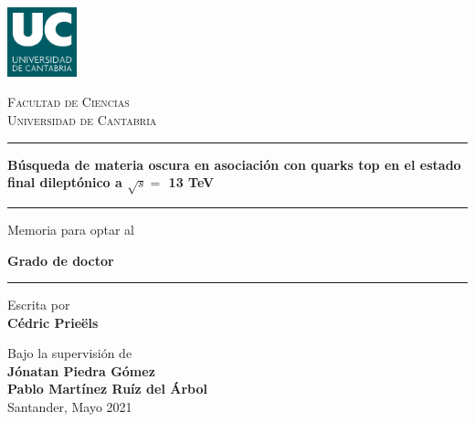 \documentclass[a4paper, 10pt, openright]{report}
\begin{document}

\thispagestyle{empty}
\phantom{a}
\vfill
\newpage

\begin{titlepage}

	\centering
	\includegraphics[width=0.15\textwidth]{figs/image_UC.png}\par
	{\scshape\LARGE Facultad de Ciencias \\ \vspace{-15pt} Universidad de Cantabria \par}
	
	\vspace{0.8cm}
	
	\noindent\rule{15cm}{0.4pt}\par 
	{\huge\bfseries B\'{u}squeda de materia oscura en asociaci\'{o}n con quarks top en el estado final dilept\'{o}nico a $\sqrt{s} = $ 13 TeV\par \vspace{10pt}}
	\noindent\rule{15cm}{0.4pt}\par 
	
	{\vspace{20pt} \Large Memoria para optar al \par \LARGE \textbf{Grado de doctor} \vspace{20pt} \par \noindent\rule{15cm}{0.4pt}}
	
	\vspace{0.8cm}
	{\Large Escrita por \\ \textbf{C\'{e}dric Prie\"{e}ls}\par}
	\vspace{0.5cm}
	{\Large Bajo la supervisi\'{o}n de \\ \textbf{J\'{o}natan Piedra G\'{o}mez} \\
	\vspace{-10pt}
	\textbf{Pablo Mart\'{i}nez Ru\'{i}z del \'{A}rbol}\\}
	\vspace{2.6cm}
	{\Large Santander, Mayo 2021}
	\vfill

\end{titlepage}


\thispagestyle{empty}
\phantom{a}
\vfill
\newpage
\end{document}
